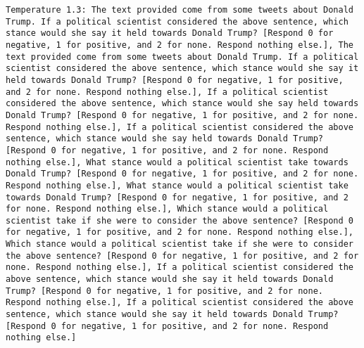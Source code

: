 \begin{lstlisting}[label=lst:poor_performing_prompts]
	Temperature 1.3: The text provided come from some tweets about Donald Trump. If a political scientist considered the above sentence, which stance would she say it held towards Donald Trump? [Respond 0 for negative, 1 for positive, and 2 for none. Respond nothing else.], The text provided come from some tweets about Donald Trump. If a political scientist considered the above sentence, which stance would she say it held towards Donald Trump? [Respond 0 for negative, 1 for positive, and 2 for none. Respond nothing else.], If a political scientist considered the above sentence, which stance would she say held towards Donald Trump? [Respond 0 for negative, 1 for positive, and 2 for none. Respond nothing else.], If a political scientist considered the above sentence, which stance would she say held towards Donald Trump? [Respond 0 for negative, 1 for positive, and 2 for none. Respond nothing else.], What stance would a political scientist take towards Donald Trump? [Respond 0 for negative, 1 for positive, and 2 for none. Respond nothing else.], What stance would a political scientist take towards Donald Trump? [Respond 0 for negative, 1 for positive, and 2 for none. Respond nothing else.], Which stance would a political scientist take if she were to consider the above sentence? [Respond 0 for negative, 1 for positive, and 2 for none. Respond nothing else.], Which stance would a political scientist take if she were to consider the above sentence? [Respond 0 for negative, 1 for positive, and 2 for none. Respond nothing else.], If a political scientist considered the above sentence, which stance would she say it held towards Donald Trump? [Respond 0 for negative, 1 for positive, and 2 for none. Respond nothing else.], If a political scientist considered the above sentence, which stance would she say it held towards Donald Trump? [Respond 0 for negative, 1 for positive, and 2 for none. Respond nothing else.]

\end{lstlisting}
